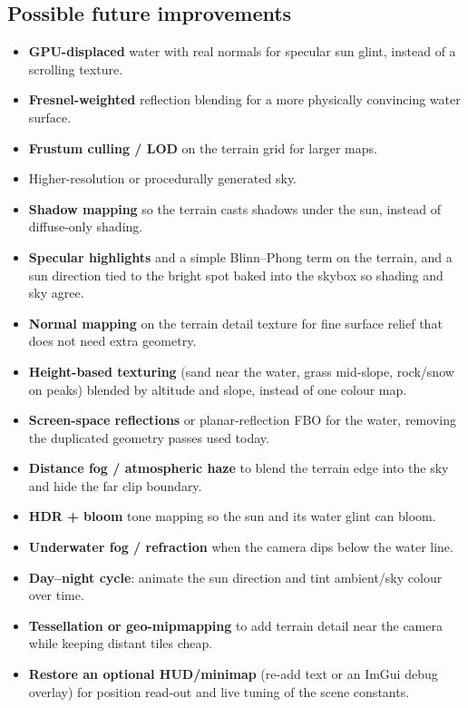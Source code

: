 \documentclass[11pt]{article}
\begin{document}
\subsection*{Possible future improvements}
\begin{itemize}[leftmargin=1.5em]
  \item \textbf{GPU-displaced} water with real normals for specular sun glint, instead of
        a scrolling texture.
  \item \textbf{Fresnel-weighted} reflection blending for a more physically convincing
        water surface.
  \item \textbf{Frustum culling / LOD} on the terrain grid for larger maps.
  \item Higher-resolution or procedurally generated sky.
  \item \textbf{Shadow mapping} so the terrain casts shadows under the sun, instead of
        diffuse-only shading.
  \item \textbf{Specular highlights} and a simple Blinn--Phong term on the terrain, and a
        sun direction tied to the bright spot baked into the skybox so shading and sky agree.
  \item \textbf{Normal mapping} on the terrain detail texture for fine surface relief that
        does not need extra geometry.
  \item \textbf{Height-based texturing} (sand near the water, grass mid-slope, rock/snow on
        peaks) blended by altitude and slope, instead of one colour map.
  \item \textbf{Screen-space reflections} or planar-reflection FBO for the water, removing
        the duplicated geometry passes used today.
  \item \textbf{Distance fog / atmospheric haze} to blend the terrain edge into the sky and
        hide the far clip boundary.
  \item \textbf{HDR + bloom} tone mapping so the sun and its water glint can bloom.
  \item \textbf{Underwater fog / refraction} when the camera dips below the water line.
  \item \textbf{Day--night cycle}: animate the sun direction and tint ambient/sky colour
        over time.
  \item \textbf{Tessellation or geo-mipmapping} to add terrain detail near the camera while
        keeping distant tiles cheap.
  \item \textbf{Restore an optional HUD/minimap} (re-add text or an ImGui debug overlay) for
        position read-out and live tuning of the scene constants.
\end{itemize}
\end{document}
